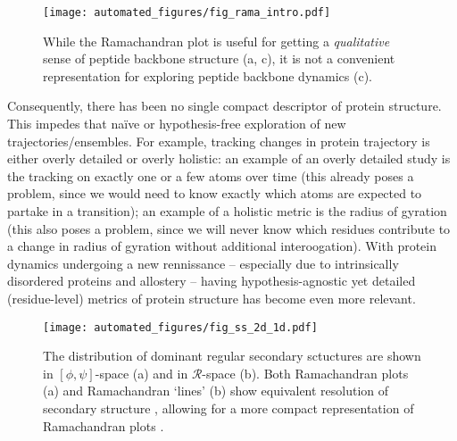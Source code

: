 \documentclass[fleqn,10pt,lineno]{wlpeerj} %
\newcommand{\Fig}[1]{Fig.~\ref{#1}}
\newcommand{\gname}{BackMAP}
\newcommand{\pname}{\textsc{\gname}\xspace}
\begin{document}
\begin{figure*}[t!]
\centering
\texttt{[image: automated\_figures/fig\_rama\_intro.pdf]}
\caption{While the Ramachandran plot is useful for getting a {\it qualitative} sense of peptide backbone structure (a, c), it is not a convenient representation for exploring peptide backbone dynamics (c).\label{fig:ramaintro}} 
\end{figure*}

Consequently, there has been no single compact descriptor of protein structure. This impedes that na{\"i}ve or hypothesis-free exploration of new trajectories/ensembles. %
For example, tracking changes in protein trajectory is either overly detailed or overly holistic: an example of an overly detailed study is the tracking on exactly one or a few atoms over time (this already poses a problem, since we would need to know exactly which atoms are expected to partake in a transition); an example of a holistic metric is the radius of gyration (this also poses a problem, since we will never know which residues contribute to a change in radius of gyration without additional interoogation). %
With protein dynamics undergoing a new rennissance -- especially due to intrinsically disordered proteins and allostery -- having hypothesis-agnostic yet detailed (residue-level) metrics of protein structure has become even more relevant. 

\begin{figure}[t!]
\centering
\texttt{[image: automated\_figures/fig\_ss\_2d\_1d.pdf]}
\caption{The distribution of dominant regular secondary sctuctures are shown in $[\phi,\psi]$-space (a) and in $\mathcal{R}$-space (b). Both Ramachandran plots (a) and Ramachandran `lines' (b) show equivalent resolution of secondary structure , allowing for a more compact representation of Ramachandran plots \cite{Mannige2016}.\label{fig:ramasecondary}} 
\end{figure}
\end{document}

